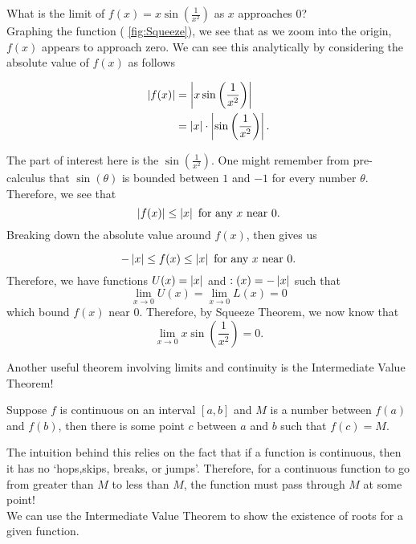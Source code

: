 \begin{exmp}
  What is the limit of $f(x)=x\sin\left(\frac{1}{x^2}\right)$ as $x$ approaches 0?\\

  Graphing the function ( \cref{fig:Squeeze}), we see that as we zoom into the origin, $f(x)$ appears to approach zero. We can see this analytically by considering the absolute value of $f(x)$ as follows

  \begin{align}
    \left| f(x) \right|&=\left| x\sin\left(\frac{1}{x^2}\right)  \right|\\
    &= \left| x \right|\cdot\left| \sin\left(\frac{1}{x^2}\right)  \right|.
  \end{align}

The part of interest here is the $\sin\left(\frac{1}{x^2}\right)$. One might remember from pre-calculus that $\sin(\theta)$ is bounded between $1$ and $-1$ for every number $\theta$. Therefore, we see that
\[
\left| f(x) \right|\leq \left| x \right|\text{ for any }x \text{ near }0.
\]
Breaking down the absolute value around $f(x)$, then gives us

\[
-\left| x \right|\leq f(x)\leq \left| x \right|\text{ for any }x \text{ near }0.
\]
Therefore, we have functions $U(x)=\left| x \right|$ and $:(x)=-\left| x \right|$ such that
\[
\lim\limits_{x\to 0} U(x)=\lim\limits_{x\to 0} L(x)= 0
\]
which bound $f(x)$ near 0. Therefore, by Squeeze Theorem, we now know that
\[
\lim\limits_{x\to 0}x\sin\left(\frac{1}{x^2}\right)=0.
\]
\end{exmp}

Another useful theorem involving limits and continuity is the Intermediate Value Theorem!

\begin{thm}
  Suppose $f$ is continuous on an interval $[a,b]$ and $M$ is a number between $f(a)$ and $f(b)$, then there is some point $c$ between $a$ and $b$ such that $f(c)=M$.
\end{thm}
The intuition behind this relies on the fact that if a function is continuous, then it has no `hops,skips, breaks, or jumps'. Therefore, for a continuous function to go from greater than $M$ to less than $M$, the function must pass through $M$ at some point!\\

We can use the Intermediate Value Theorem to show the existence of roots for a given function.

